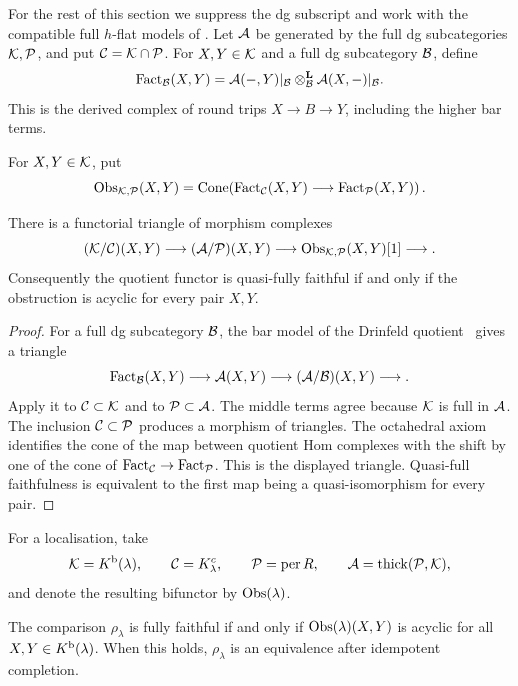 For the rest of this section we suppress the dg subscript and work with the compatible full \(h\)-flat models of .  Let \(\mathcal A\) be generated by the full dg subcategories \(\mathcal K,\mathcal P\), and put \(\mathcal C=\mathcal K\cap\mathcal P\).  For \(X,Y\in\mathcal K\) and a full dg subcategory \(\mathcal B\), define
\[
 \operatorname{Fact}_{\mathcal B}(X,Y)=
 \mathcal A(-,Y)|_{\mathcal B}\otimes^{\mathbf L}_{\mathcal B}\mathcal A(X,-)|_{\mathcal B}.
\]
This is the derived complex of round trips \(X\to B\to Y\), including the higher bar terms.

\begin{definition}\label{def:obs}
For \(X,Y\in\mathcal K\), put
\[
 \operatorname{Obs}_{\mathcal K,\mathcal P}(X,Y)=
 \operatorname{Cone}\!\left(\operatorname{Fact}_{\mathcal C}(X,Y)\longrightarrow\operatorname{Fact}_{\mathcal P}(X,Y)\right).
\]
\end{definition}

\begin{theorem}\label{thm:obs-triangle}
There is a functorial triangle of morphism complexes
\[
 (\mathcal K/\mathcal C)(X,Y)\longrightarrow(\mathcal A/\mathcal P)(X,Y)
 \longrightarrow\operatorname{Obs}_{\mathcal K,\mathcal P}(X,Y)[1]\longrightarrow.
\]
Consequently the quotient functor is quasi-fully faithful if and only if the obstruction is acyclic for every pair \(X,Y\).
\end{theorem}

\begin{proof}
For a full dg subcategory \(\mathcal B\), the bar model of the Drinfeld quotient~\cite[\S1.3.1]{Drinfeld04} gives a triangle
\[
 \operatorname{Fact}_{\mathcal B}(X,Y)\longrightarrow\mathcal A(X,Y)
 \longrightarrow(\mathcal A/\mathcal B)(X,Y)\longrightarrow.
\]
Apply it to \(\mathcal C\subset\mathcal K\) and to \(\mathcal P\subset\mathcal A\).  The middle terms agree because \(\mathcal K\) is full in \(\mathcal A\).  The inclusion \(\mathcal C\subset\mathcal P\) produces a morphism of triangles.  The octahedral axiom identifies the cone of the map between quotient Hom complexes with the shift by one of the cone of \(\operatorname{Fact}_{\mathcal C}\to\operatorname{Fact}_{\mathcal P}\).  This is the displayed triangle.  Quasi-full faithfulness is equivalent to the first map being a quasi-isomorphism for every pair.
\end{proof}

For a localisation, take
\[
 \mathcal K=K^{\mathrm b}(\lambda),\qquad \mathcal C=K^c_\lambda,
 \qquad \mathcal P=\operatorname{per} R,
 \qquad \mathcal A=\operatorname{thick}(\mathcal P,\mathcal K),
\]
and denote the resulting bifunctor by \(\operatorname{Obs}(\lambda)\).

\begin{corollary}\label{cor:obs-comparison}
The comparison \(\rho_\lambda\) is fully faithful if and only if \(\operatorname{Obs}(\lambda)(X,Y)\) is acyclic for all \(X,Y\in K^{\mathrm b}(\lambda)\).  When this holds, \(\rho_\lambda\) is an equivalence after idempotent completion.
\end{corollary}

